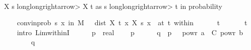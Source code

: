 \begin{isabellebody}
\ \ \isamarkupfalse%
%
\begin{isamarkuptext}%
X s \<longlongrightarrow> X t as s \<longlongrightarrow> t in probability%
\end{isamarkuptext}\isamarkuptrue%
\ \ \isamarkupfalse%
\ conv{\isacharunderscore}{\kern0pt}in{\isacharunderscore}{\kern0pt}prob{\isacharcolon}{\kern0pt}\ {\isachardoublequoteopen}{\isacharparenleft}{\kern0pt}{\isacharparenleft}{\kern0pt}{\isasymlambda}s{\isachardot}{\kern0pt}\ {\isasymP}{\isacharparenleft}{\kern0pt}x\ in\ {\isacharquery}{\kern0pt}M{\isachardot}{\kern0pt}\ {\isasymepsilon}\ {\isasymle}\ dist\ {\isacharparenleft}{\kern0pt}X\ t\ x{\isacharparenright}{\kern0pt}\ {\isacharparenleft}{\kern0pt}X\ s\ x{\isacharparenright}{\kern0pt}{\isacharparenright}{\kern0pt}{\isacharparenright}{\kern0pt}\ {\isasymlonglongrightarrow}\ {}{\isacharparenright}{\kern0pt}{\isacharparenleft}{\kern0pt}at\ t\ within\ {\isacharparenleft}{\kern0pt}{\isacharbraceleft}{\kern0pt}{}{\isachardot}{\kern0pt}{\isachardot}{\kern0pt}{\isacharbraceright}{\kern0pt}{\isacharparenright}{\kern0pt}{\isacharparenright}{\kern0pt}{\isachardoublequoteclose}\isanewline
\ \ \ \ \ {\isachardoublequoteopen}t\ {\isasymge}\ {}{\isachardoublequoteclose}\ {\isachardoublequoteopen}{\isasymepsilon}\ {\isachargreater}{\kern0pt}\ {}{\isachardoublequoteclose}\ \ t\ {\isasymepsilon}\isanewline
\ \ \isamarkupfalse%
\ {\isacharparenleft}{\kern0pt}intro\ Lim{\isacharunderscore}{\kern0pt}withinI{\isacharparenright}{\kern0pt}\isanewline
\ \ \ \ \isamarkupfalse%
\ p\ {\isacharcolon}{\kern0pt}{\isacharcolon}{\kern0pt}\ real\ \isamarkupfalse%
\ {\isachardoublequoteopen}{}\ {\isacharless}{\kern0pt}\ p{\isachardoublequoteclose}\isanewline
\ \ \ \ \isamarkupfalse%
\ {\isacharquery}{\kern0pt}q\ {\isacharequal}{\kern0pt}\ {\isachardoublequoteopen}{\isacharparenleft}{\kern0pt}p\ {\isacharasterisk}{\kern0pt}\ {\isasymepsilon}\ powr\ a\ {\isacharslash}{\kern0pt}\ C{\isacharparenright}{\kern0pt}\ powr\ {\isacharparenleft}{\kern0pt}{}{\isacharslash}{\kern0pt}{\isacharparenleft}{\kern0pt}{}{\isacharplus}{\kern0pt}b{\isacharparenright}{\kern0pt}{\isacharparenright}{\kern0pt}{\isachardoublequoteclose}\isanewline
\ \ \ \ \isamarkupfalse%
\ {\isachardoublequoteopen}{}\ {\isacharless}{\kern0pt}\ {\isacharquery}{\kern0pt}q{\isachardoublequoteclose}\isanewline
\ \ \ \ \ \ \isamarkupfalse%

\end{isabellebody}
